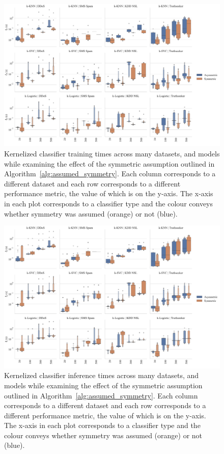 \documentclass[conference]{IEEEtran}
\begin{document}
\begin{figure}
\centering
        \includegraphics[width=\textwidth]{figs/combined/symmetric_models_vs_train_time.pdf}
        \caption{Kernelized classifier training times across many datasets, and models while examining the effect of the symmetric assumption outlined in Algorithm~\ref{alg:assumed_symmetry}. Each column corresponds to a different dataset and each row corresponds to a different performance metric, the value of which is on the y-axis. The x-axis in each plot corresponds to a classifier type and the colour conveys whether symmetry was assumed (orange) or not (blue).}
        \label{fig:sym_train_time}
\end{figure}
\begin{figure}[t]
    \centering
    \includegraphics[width=\textwidth]{figs/combined/symmetric_models_vs_predict_time.pdf}
    \caption{Kernelized classifier inference times across many datasets, and models while examining the effect of the symmetric assumption outlined in Algorithm~\ref{alg:assumed_symmetry}. Each column corresponds to a different dataset and each row corresponds to a different performance metric, the value of which is on the y-axis. The x-axis in each plot corresponds to a classifier type and the colour conveys whether symmetry was assumed (orange) or not (blue).}
    \label{fig:symm_pred_time}
\end{figure}
\end{document}
